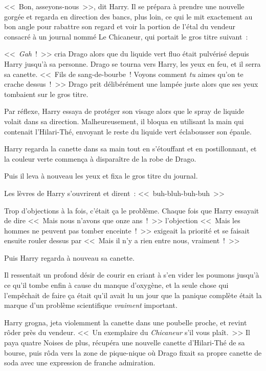 <<~Bon, asseyons-nous~>>, dit Harry. Il se prépara à prendre une nouvelle gorgée et regarda en direction des bancs, plus loin, ce qui le mit exactement au bon angle pour rabattre son regard et voir la portion de l'étal du vendeur consacré à un journal nommé Le Chicaneur, qui portait le gros titre suivant~:


<<~\emph{Gah}~!~>> cria Drago alors que du liquide vert fluo était pulvérisé depuis Harry jusqu'à sa personne. Drago se tourna vers Harry, les yeux en feu, et il serra sa canette. <<~Fils de sang-de-bourbe~! Voyons comment \emph{tu} aimes qu'on te crache dessus~!~>> Drago prit délibérément une lampée juste alors que ses yeux tombaient sur le gros titre.

Par réflexe, Harry essaya de protéger son visage alors que le spray de liquide volait dans sa direction. Malheureusement, il bloqua en utilisant la main qui contenait l'Hilari-Thé, envoyant le reste du liquide vert éclabousser son épaule.

Harry regarda la canette dans sa main tout en s'étouffant et en postillonnant, et la couleur verte commença à disparaître de la robe de Drago.

Puis il leva à nouveau les yeux et fixa le gros titre du journal.


Les lèvres de Harry s'ouvrirent et dirent~: <<~buh-bluh-buh-buh~>>

Trop d'objections à la fois, c'était ça le problème. Chaque fois que Harry essayait de dire <<~Mais nous n'avons que onze ans~!~>> l'objection <<~Mais les hommes ne peuvent pas tomber enceinte~!~>> exigeait la priorité et se faisait ensuite rouler dessus par <<~Mais il n'y a rien entre nous, vraiment~!~>>

Puis Harry regarda à nouveau sa canette.

Il ressentait un profond désir de courir en criant à s'en vider les poumons jusqu'à ce qu'il tombe enfin à cause du manque d'oxygène, et la seule chose qui l'empêchait de faire ça était qu'il avait lu un jour que la panique complète était la marque d'un problème scientifique \emph{vraiment} important.

Harry grogna, jeta violemment la canette dans une poubelle proche, et revint rôder près du vendeur. <<~Un exemplaire du \emph{Chicaneur} s'il vous plaît.~>> Il paya quatre Noises de plus, récupéra une nouvelle canette d'Hilari-Thé de sa bourse, puis rôda vers la zone de pique-nique où Drago fixait sa propre canette de soda avec une expression de franche admiration.

